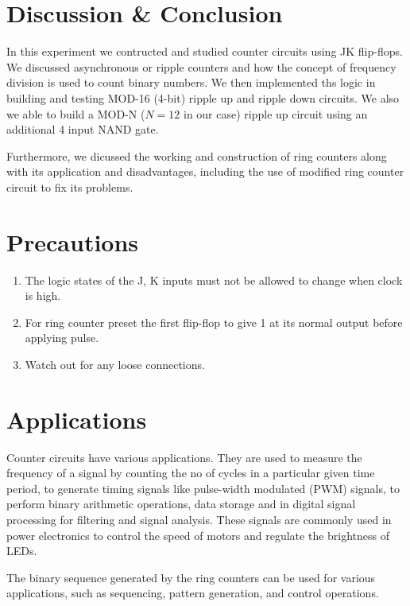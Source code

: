 \section{Discussion \& Conclusion}
In this experiment we contructed and studied counter circuits using JK flip-flops. We discussed asynchronous or ripple counters and how the concept of frequency division is used to count binary numbers. We then implemented ths logic in building and testing MOD-16 (4-bit) ripple up and ripple down circuits. We also we able to build a MOD-N ($N=12$ in our case) ripple up circuit using an additional 4 input NAND gate.

Furthermore, we dicussed the working and construction of ring counters along with its application and disadvantages, including the use of modified ring counter circuit to fix its problems.


\section{Precautions}

\begin{enumerate}
    \item The logic states of the J, K inputs must not be allowed to change when clock is high.
    \item For ring counter preset the first flip-flop to give 1 at its normal output before applying pulse.
    \item Watch out for any loose connections.
\end{enumerate}

\section{Applications}
Counter circuits have various applications. They are used to measure the frequency of a signal by counting the no of cycles in a particular given time period, to generate timing signals like pulse-width modulated (PWM) signals, to perform binary arithmetic operations, data storage and in digital signal processing for filtering and signal analysis. These signals are commonly used in power electronics to control the speed of motors and regulate the brightness of LEDs.

The binary sequence generated by the ring counters can be used for various applications, such as sequencing, pattern generation, and control operations.
